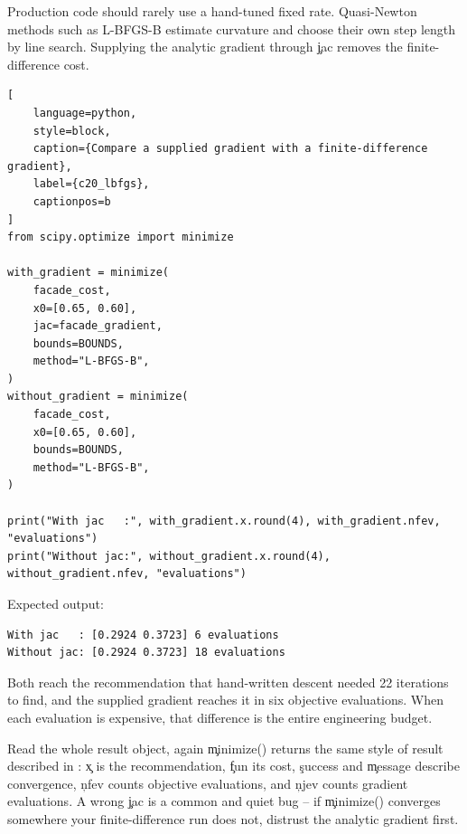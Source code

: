 
Production code should rarely use a hand-tuned fixed rate. Quasi-Newton methods
such as L-BFGS-B estimate curvature and choose their own step length by line
search. Supplying the analytic gradient through \c{jac} removes the
finite-difference cost.

\begin{lstlisting}[
    language=python,
    style=block,
    caption={Compare a supplied gradient with a finite-difference gradient},
    label={c20_lbfgs},
    captionpos=b
]
from scipy.optimize import minimize

with_gradient = minimize(
    facade_cost,
    x0=[0.65, 0.60],
    jac=facade_gradient,
    bounds=BOUNDS,
    method="L-BFGS-B",
)
without_gradient = minimize(
    facade_cost,
    x0=[0.65, 0.60],
    bounds=BOUNDS,
    method="L-BFGS-B",
)

print("With jac   :", with_gradient.x.round(4), with_gradient.nfev, "evaluations")
print("Without jac:", without_gradient.x.round(4), without_gradient.nfev, "evaluations")
\end{lstlisting}

Expected output:

\begin{lstlisting}[language=text, style=block, caption={The same optimum at different evaluation costs}, label={c20_lbfgs_output}, captionpos=b]
With jac   : [0.2924 0.3723] 6 evaluations
Without jac: [0.2924 0.3723] 18 evaluations
\end{lstlisting}

Both reach the recommendation that hand-written descent needed 22 iterations to
find, and the supplied gradient reaches it in six objective evaluations. When
each evaluation is expensive, that difference is the entire engineering budget.

\begin{SyntaxBox}{Read the whole result object, again}
\c{minimize()} returns the same style of result described in
: \c{x} is the recommendation, \c{fun} its cost,
\c{success} and \c{message} describe convergence, \c{nfev} counts objective
evaluations, and \c{njev} counts gradient evaluations. A wrong \c{jac} is a
common and quiet bug -- if \c{minimize()} converges somewhere your
finite-difference run does not, distrust the analytic gradient first.
\end{SyntaxBox}


